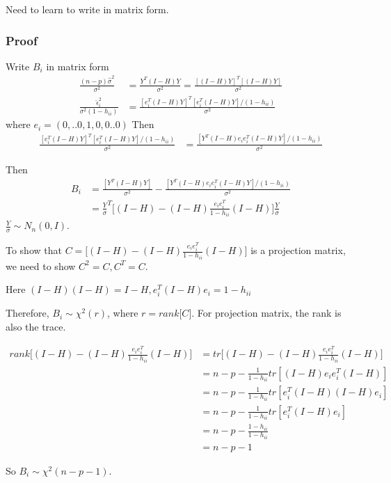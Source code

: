 \documentclass[11pt]{article} %
\begin{document}
Need to learn to write in matrix form. 



\subsubsection{Proof}
Write $B_i$ in matrix form
\begin{align*}
	\frac{(n-p)\hat{\sigma}^2 }{\sigma^2} &= \frac{Y^T (I-H) Y}{\sigma^2} = \frac{[(I-H)Y]^T [(I-H)Y]}{\sigma^2} \\
	\frac{\hat{\epsilon}_i^2}{\sigma^2(1-h_{ii})}&= \frac{[e_i^T (I-H)Y]^T [ e_i^T (I-H)Y]/(1- h_{ii})}{\sigma^2}
\end{align*}
where $e_i = (0,..0, 1, 0, 0..0)$ 
Then 
\begin{align*}
	\frac{[e_i^T (I-H)Y]^T [ e_i^T (I-H)Y]/(1- h_{ii})}{\sigma^2} & = \frac{[ Y^T (I-H) e_i e_i^T (I-H)Y]/(1- h_{ii})}{\sigma^2} 
\end{align*}

Then
\begin{align*}
	B_i &= \frac{[Y^T (I-H)Y]}{\sigma^2} -   \frac{[ Y^T (I-H) e_i e_i^T (I-H)Y]/(1- h_{ii})}{\sigma^2} \\
	&= \frac{Y}{\sigma}^T \Big[(I-H) - (I-H) \frac{e_i e_i^T }{1- h_{ii}} (I-H)\Big] \frac{Y}{\sigma}
\end{align*}
$\frac{Y}{\sigma} \sim N_n(0, I)$. 

To show that $C = \Big[(I-H) - (I-H) \frac{e_i e_i^T }{1- h_{ii}} (I-H)\Big]  $ is a projection matrix, we need to show $C^2 = C, C^T= C$.

Here $(I-H)(I-H) = I-H, e_i^T (I-H) e_i = 1- h_{ii}$ 

Therefore, $B_i \sim \chi^2(r)$, where $r = rank \Big[C \Big]$. For projection matrix, the rank is also the trace.

\begin{align*}
	rank \Big[(I-H) - (I-H) \frac{e_i e_i^T }{1- h_{ii}} (I-H)\Big] &= tr \Big[(I-H) - (I-H) \frac{e_i e_i^T }{1- h_{ii}} (I-H)\Big]  \\
	&= n-p - \frac{1}{1-h_{ii}} tr[(I-H) e_i e_i^T (I-H)] \\
	&= n-p -  \frac{1}{1-h_{ii}} tr[e_i^T (I-H) (I-H) e_i ] \\
	&= n-p -  \frac{1}{1-h_{ii}} tr[e_i^T (I-H)  e_i ] \\
	&= n-p -  \frac{1-h_{ii}}{1-h_{ii}} \\
	&= n-p-1
\end{align*}

So $B_i \sim \chi^2(n-p-1)$.
\end{document}

